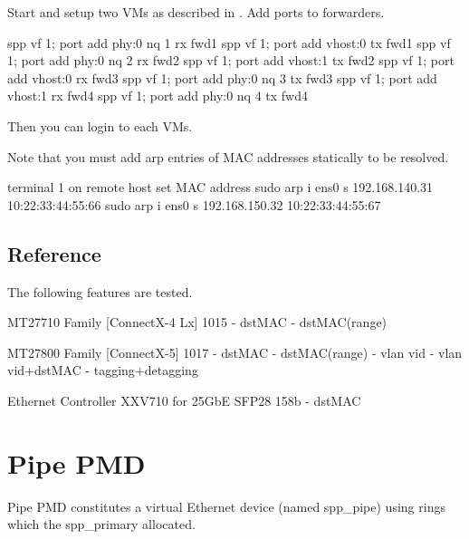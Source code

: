 \documentclass[a4paper,11pt,openany,oneside,english]{sphinxmanual}
\begin{document}
Start and setup two VMs as described in {\hyperref[\detokenize{usecases/spp_vf:spp-usecases-vf-ssh}]{}}.
Add ports to forwarders.

\begin{sphinxVerbatim}[commandchars=\\\{\},formatcom=\footnotesize]
spp \PYGZgt{} vf 1; port add phy:0 nq 1 rx fwd1
spp \PYGZgt{} vf 1; port add vhost:0 tx fwd1
spp \PYGZgt{} vf 1; port add phy:0 nq 2 rx fwd2
spp \PYGZgt{} vf 1; port add vhost:1 tx fwd2
spp \PYGZgt{} vf 1; port add vhost:0 rx fwd3
spp \PYGZgt{} vf 1; port add phy:0 nq 3 tx fwd3
spp \PYGZgt{} vf 1; port add vhost:1 rx fwd4
spp \PYGZgt{} vf 1; port add phy:0 nq 4 tx fwd4
\end{sphinxVerbatim}

Then you can login to each VMs.

Note that you must add arp entries of MAC addresses statically to be resolved.

\begin{sphinxVerbatim}[commandchars=\\\{\},formatcom=\footnotesize]
\PYGZsh{} terminal 1 on remote host
\PYGZsh{} set MAC address
\PYGZdl{} sudo arp \PYGZhy{}i ens0 \PYGZhy{}s 192.168.140.31 10:22:33:44:55:66
\PYGZdl{} sudo arp \PYGZhy{}i ens0 \PYGZhy{}s 192.168.150.32 10:22:33:44:55:67
\end{sphinxVerbatim}


\subsection{Reference}
\label{\detokenize{usecases/hardware-offload:reference}}
The following features are tested.

MT27710 Family {[}ConnectX-4 Lx{]} 1015
- dstMAC
- dstMAC(range)

MT27800 Family {[}ConnectX-5{]} 1017
- dstMAC
- dstMAC(range)
- vlan vid
- vlan vid+dstMAC
- tagging+detagging

Ethernet Controller XXV710 for 25GbE SFP28 158b
- dstMAC


\section{Pipe PMD}
\label{\detokenize{usecases/pipe_pmd:pipe-pmd}}\label{\detokenize{usecases/pipe_pmd:usecase-pipe-pmd}}\label{\detokenize{usecases/pipe_pmd::doc}}
Pipe PMD constitutes a virtual Ethernet device (named spp\_pipe) using
rings which the spp\_primary allocated.
\end{document}
